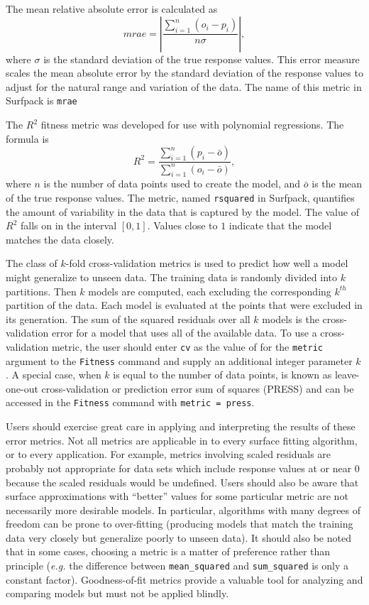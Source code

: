 \documentclass{article}
\begin{document}
The mean relative absolute error is calculated as
\begin{equation}
  mrae = \left| \frac{ \sum_{i=1}^{n}{\left(o_i - p_i\right)}}{n\sigma} \right|,
\end{equation}
where $\sigma$ is the standard deviation of the true response values.  This error measure scales the mean absolute error by the standard deviation of the response values to adjust for the natural range and variation of the data.  The name of this metric in Surfpack is \texttt{mrae}

The $R^2$ fitness metric was developed for use with polynomial regressions.  The formula is
\begin{equation}
  R^2 = \frac{\sum_{i=1}^{n}{\left(p_i - \bar{o}\right)}}{ \sum_{i=1}^{n}{\left(o_i - \bar{o}\right)}},
\end{equation}
where $n$ is the number of data points used to create the model, and $\bar{o}$ is the mean of the true response values.  The metric, named \texttt{rsquared} in Surfpack, quantifies the amount of variability in the data that is captured by the model.  The value of $R^2$ falls on in the interval $[0,1]$.  Values close to $1$ indicate that the model matches the data closely.

The class of $k$-fold cross-validation metrics is used to predict how well a model might generalize to unseen data.  The training data is randomly divided into $k$ partitions.  Then $k$ models are computed, each excluding the corresponding $k^{th}$ partition of the data.  Each model is evaluated at the points that were excluded in its generation.  The sum of the squared residuals over all $k$ models is the cross-validation error for a model that uses all of the available data.  To use a cross-validation metric, the user should enter \texttt{cv} as the value of for the \texttt{metric} argument to the \texttt{Fitness} command and supply an additional integer parameter $k$.  A special case, when $k$ is equal to the number of data points, is known as leave-one-out cross-validation or prediction error sum of squares (PRESS) and can be accessed in the \texttt{Fitness} command with \texttt{metric = press}.

Users should exercise great care in applying and interpreting the results of these error metrics.  Not all metrics are applicable in to every surface fitting algorithm, or to every application.  For example, metrics involving scaled residuals are probably not appropriate for data sets which include response values at or near 0 because the scaled residuals would be undefined.  Users should also be aware that surface approximations with ``better'' values for some particular metric are not necessarily more desirable models.  In particular, algorithms with many degrees of freedom can be prone to over-fitting (producing models that match the training data very closely but generalize poorly to unseen data).  It should also be noted that in some cases, choosing a metric is a matter of preference rather than principle ({\em e.g.} the difference between \texttt{mean\_squared} and \texttt{sum\_squared} is only a constant factor).  Goodness-of-fit metrics provide a valuable tool for analyzing and comparing models but must not be applied blindly.
\end{document}
